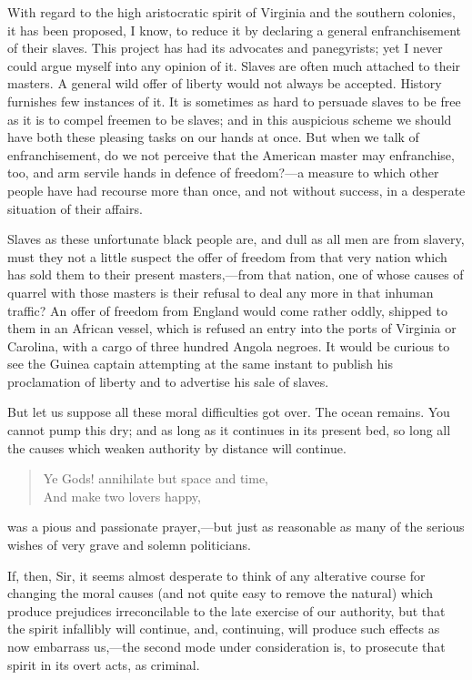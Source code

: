 With regard to the high aristocratic spirit of Virginia and the southern colonies, it has been proposed, I know, to reduce it by declaring a general enfranchisement of their slaves. This project has had its advocates and panegyrists; yet I never could argue myself into any opinion of it. Slaves are often much attached to their masters. A general wild offer of liberty would not always be accepted. History furnishes few instances of it. It is sometimes as hard to persuade slaves to be free as it is to compel freemen to be slaves; and in this auspicious scheme we should have both these pleasing tasks on our hands at once. But when we talk of enfranchisement, do we not perceive that the American master may enfranchise, too, and arm servile hands in defence of freedom?—a measure to which other people have had recourse more than once, and not without success, in a desperate situation of their affairs.

Slaves as these unfortunate black people are, and dull as all men are from slavery, must they not a little suspect the offer of freedom from that very nation which has sold them to their present masters,—from that nation, one of whose causes of quarrel with those masters is their refusal to deal any more in that inhuman traffic? An offer of freedom from England would come rather oddly, shipped to them in an African vessel, which is refused an entry into the ports of Virginia or Carolina, with a cargo of three hundred Angola negroes. It would be curious to see the Guinea captain attempting at the same instant to publish his proclamation of liberty and to advertise his sale of slaves.

But let us suppose all these moral difficulties got over. The ocean remains. You cannot pump this dry; and as long as it continues in its present bed, so long all the causes which weaken authority by distance will continue.

\begin{verse}
Ye Gods! annihilate but space and time, \\
And make two lovers happy,
\end{verse}

was a pious and passionate prayer,—but just as reasonable as many of the serious wishes of very grave and solemn politicians.

If, then, Sir, it seems almost desperate to think of any alterative course for changing the moral causes (and not quite easy to remove the natural) which produce prejudices irreconcilable to the late exercise of our authority, but that the spirit infallibly will continue, and, continuing, will produce such effects as now embarrass us,—the second mode under consideration is, to prosecute that spirit in its overt acts, as criminal.

